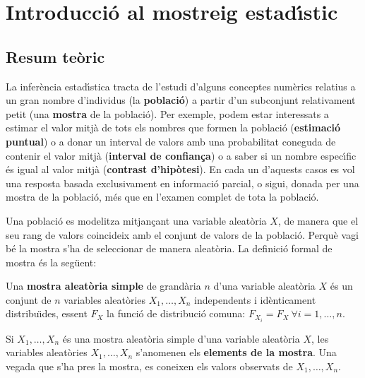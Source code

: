 \chapter{Introducci\'o al mostreig estad\'{\i}stic}

\section{Resum te\`oric}

La infer\`encia estad\'{\i}stica  
tracta de l'estudi d'alguns conceptes num\`erics
relatius a un gran nombre d'individus (la {\bf poblaci\'o})
 a partir d'un
subconjunt relativament petit (una {\bf mostra} de la poblaci\'o). Per exemple,
podem estar interessats a estimar el valor mitj\`a de tots els nombres que 
formen la poblaci\'o ({\bf estimaci\'o puntual})
 o a donar un interval de valors amb una
probabilitat coneguda de contenir el valor mitj\`a 
({\bf interval de confian\c ca}) 
o a saber si un nombre espec\'{\i}fic \'es igual al valor mitj\`a ({\bf contrast
d'hip\`otesi}). 
En cada un d'aquests casos es vol una resposta basada
exclusivament en informaci\'o parcial, o sigui, donada per una mostra
 de la poblaci\'o, 
m\'es que en l'examen complet de tota la poblaci\'o.

Una poblaci\'o es modelitza mitjan\c{c}ant 
una variable aleat\`oria $X$, de manera que el seu rang de valors 
coincideix amb el conjunt de valors de la poblaci\'o. Perqu\`e
vagi b\'e la mostra s'ha de seleccionar de manera aleat\`oria. 
La definici\'o formal de mostra \'es la seg\"uent:

\begin{defin}
Una {\bf mostra aleat\`oria simple} 
de grand\`aria $n$ d'una variable aleat\`oria 
$X$ \'es un conjunt de $n$ variables aleat\`ories $X_1, \ldots , X_n$ independents i
id\`enticament distribu\"{\i}des, essent $F_X$ la funci\'o de distribuci\'o 
comuna: 
$F_{X_i} = F_X \ \forall i = 1, \ldots , n$.
\end{defin}

Si $X_1, \ldots , X_n$ \'es una mostra aleat\`oria simple d'una variable aleat\`oria
$X$, les variables aleat\`ories $X_1, \ldots , X_n$ s'anomenen els {\bf elements
de la mostra}. Una vegada que s'ha pres la mostra, es coneixen els valors
observats de $X_1, \ldots , X_n$.

